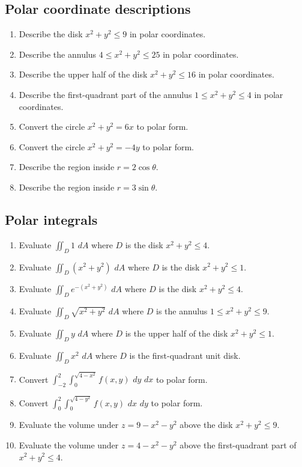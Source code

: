 \documentclass[11pt]{article}
\newcommand{\dd}{\,d}
\begin{document}
\subsection*{Polar coordinate descriptions}
\begin{enumerate}[start=9]
  \item Describe the disk $x^2+y^2\le9$ in polar coordinates.
  \item Describe the annulus $4\le x^2+y^2\le25$ in polar coordinates.
  \item Describe the upper half of the disk $x^2+y^2\le16$ in polar coordinates.
  \item Describe the first-quadrant part of the annulus $1\le x^2+y^2\le4$ in polar coordinates.
  \item Convert the circle $x^2+y^2=6x$ to polar form.
  \item Convert the circle $x^2+y^2=-4y$ to polar form.
  \item Describe the region inside $r=2\cos\theta$.
  \item Describe the region inside $r=3\sin\theta$.
\end{enumerate}

\subsection*{Polar integrals}
\begin{enumerate}[start=17]
  \item Evaluate $\iint_D1\,\dd A$ where $D$ is the disk $x^2+y^2\le4$.
  \item Evaluate $\iint_D(x^2+y^2)\,\dd A$ where $D$ is the disk $x^2+y^2\le1$.
  \item Evaluate $\iint_De^{-(x^2+y^2)}\,\dd A$ where $D$ is the disk $x^2+y^2\le4$.
  \item Evaluate $\iint_D\sqrt{x^2+y^2}\,\dd A$ where $D$ is the annulus $1\le x^2+y^2\le9$.
  \item Evaluate $\iint_D y\,\dd A$ where $D$ is the upper half of the disk $x^2+y^2\le1$.
  \item Evaluate $\iint_D x^2\,\dd A$ where $D$ is the first-quadrant unit disk.
  \item Convert $\int_{-2}^2\int_0^{\sqrt{4-x^2}}f(x,y)\,\dd y\,\dd x$ to polar form.
  \item Convert $\int_0^2\int_0^{\sqrt{4-y^2}}f(x,y)\,\dd x\,\dd y$ to polar form.
  \item Evaluate the volume under $z=9-x^2-y^2$ above the disk $x^2+y^2\le9$.
  \item Evaluate the volume under $z=4-x^2-y^2$ above the first-quadrant part of $x^2+y^2\le4$.
\end{enumerate}
\end{document}
